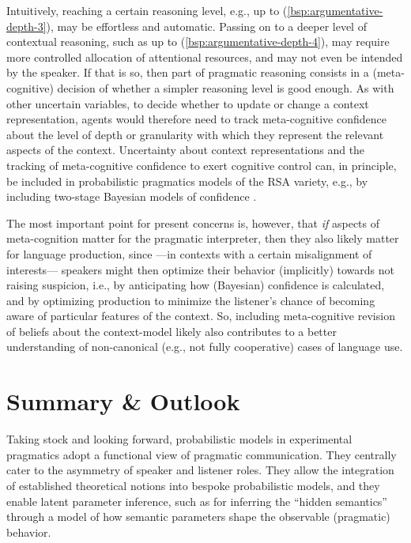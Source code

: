 \documentclass[fleqn,reqno,12pt]{article}
\newcommand{\real}{\acro{real}}
\begin{document}
Intuitively, reaching a certain reasoning level, e.g., up to (\ref{bsp:argumentative-depth-3}), may be effortless and automatic.
Passing on to a deeper level of contextual reasoning, such as up to (\ref{bsp:argumentative-depth-4}), may require more controlled allocation of attentional resources, and may not even be intended by the speaker.
If that is so, then part of \real pragmatic reasoning consists in a (meta-cognitive) decision of whether a simpler reasoning level is good enough.
As with other uncertain variables, to decide whether to update or change a context representation, agents would therefore need to track meta-cognitive confidence \citep[][]{Fleming2024:Metacognition-a} about the level of depth or granularity with which they represent the relevant aspects of the context.
Uncertainty about context representations and the tracking of meta-cognitive confidence to exert cognitive control can, in principle, be included in probabilistic pragmatics models of the RSA variety, e.g., by including two-stage Bayesian models of confidence \citep{FlemingDaw2017:Self-evaluation,SchulzFleming2023:Metacognitive-c}.

The most important point for present concerns is, however, that \emph{if} aspects of meta-cognition matter for the pragmatic interpreter, then they also likely matter for language production, since ---in contexts with a certain misalignment of interests--- speakers might then optimize their behavior (implicitly) towards not raising suspicion, i.e., by anticipating how (Bayesian) confidence is calculated, and by optimizing production to minimize the listener's chance of becoming aware of particular features of the context.
So, including meta-cognitive revision of beliefs about the context-model likely also contributes to a better understanding of non-canonical (e.g., not fully cooperative) cases of language use.

\section{Summary \& Outlook}
\label{sec:summary--outlook}

Taking stock and looking forward, probabilistic models in experimental pragmatics adopt a functional view of pragmatic communication.
They centrally cater to the asymmetry of speaker and listener roles.
They allow the integration of established theoretical notions into bespoke probabilistic models, and they enable latent parameter inference, such as for inferring the ``hidden semantics'' through a model of how semantic parameters shape the observable (pragmatic) behavior.
\end{document}
